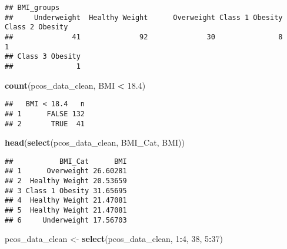 \documentclass[
]{article}
\newenvironment{Shaded}{\begin{snugshade}}{\end{snugshade}}
\newcommand{\DecValTok}[1]{\textcolor[rgb]{0.00,0.00,0.81}{#1}}
\newcommand{\FloatTok}[1]{\textcolor[rgb]{0.00,0.00,0.81}{#1}}
\newcommand{\FunctionTok}[1]{\textcolor[rgb]{0.13,0.29,0.53}{\textbf{#1}}}
\newcommand{\NormalTok}[1]{#1}
\newcommand{\OtherTok}[1]{\textcolor[rgb]{0.56,0.35,0.01}{#1}}
\newcommand{\SpecialCharTok}[1]{\textcolor[rgb]{0.81,0.36,0.00}{\textbf{#1}}}
\begin{document}
\begin{verbatim}
## BMI_groups
##     Underweight  Healthy Weight      Overweight Class 1 Obesity Class 2 Obesity 
##              41              92              30               8               1 
## Class 3 Obesity 
##               1
\end{verbatim}

\begin{Shaded}
\begin{Highlighting}[]
\FunctionTok{count}\NormalTok{(pcos\_data\_clean, BMI }\SpecialCharTok{\textless{}} \FloatTok{18.4}\NormalTok{)}
\end{Highlighting}
\end{Shaded}

\begin{verbatim}
##   BMI < 18.4   n
## 1      FALSE 132
## 2       TRUE  41
\end{verbatim}

\begin{Shaded}
\end{Shaded}

\begin{Shaded}
\begin{Highlighting}[]
\FunctionTok{head}\NormalTok{(}\FunctionTok{select}\NormalTok{(pcos\_data\_clean, BMI\_Cat, BMI))}
\end{Highlighting}
\end{Shaded}

\begin{verbatim}
##           BMI_Cat      BMI
## 1      Overweight 26.60281
## 2  Healthy Weight 20.53659
## 3 Class 1 Obesity 31.65695
## 4  Healthy Weight 21.47081
## 5  Healthy Weight 21.47081
## 6     Underweight 17.56703
\end{verbatim}

\begin{Shaded}
\begin{Highlighting}[]
\NormalTok{pcos\_data\_clean }\OtherTok{\textless{}{-}} \FunctionTok{select}\NormalTok{(pcos\_data\_clean, }\DecValTok{1}\SpecialCharTok{:}\DecValTok{4}\NormalTok{, }\DecValTok{38}\NormalTok{, }\DecValTok{5}\SpecialCharTok{:}\DecValTok{37}\NormalTok{)}
\end{Highlighting}
\end{Shaded}
\end{document}
